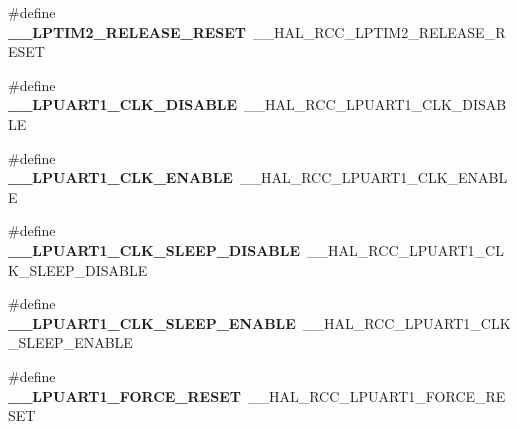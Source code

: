 \begin{DoxyCompactItemize}
\item 
\mbox{\label{group___h_a_l___r_c_c___aliased_gadd807afbe3725b62026e46e99531efac}} 
\#define {\bfseries \+\_\+\+\_\+\+L\+P\+T\+I\+M2\+\_\+\+R\+E\+L\+E\+A\+S\+E\+\_\+\+R\+E\+S\+ET}~\+\_\+\+\_\+\+H\+A\+L\+\_\+\+R\+C\+C\+\_\+\+L\+P\+T\+I\+M2\+\_\+\+R\+E\+L\+E\+A\+S\+E\+\_\+\+R\+E\+S\+ET
\item 
\mbox{\label{group___h_a_l___r_c_c___aliased_gaed58b8ae517de9035a76e9c804087fa6}} 
\#define {\bfseries \+\_\+\+\_\+\+L\+P\+U\+A\+R\+T1\+\_\+\+C\+L\+K\+\_\+\+D\+I\+S\+A\+B\+LE}~\+\_\+\+\_\+\+H\+A\+L\+\_\+\+R\+C\+C\+\_\+\+L\+P\+U\+A\+R\+T1\+\_\+\+C\+L\+K\+\_\+\+D\+I\+S\+A\+B\+LE
\item 
\mbox{\label{group___h_a_l___r_c_c___aliased_ga31a3336329cc12613dc4741af218dcca}} 
\#define {\bfseries \+\_\+\+\_\+\+L\+P\+U\+A\+R\+T1\+\_\+\+C\+L\+K\+\_\+\+E\+N\+A\+B\+LE}~\+\_\+\+\_\+\+H\+A\+L\+\_\+\+R\+C\+C\+\_\+\+L\+P\+U\+A\+R\+T1\+\_\+\+C\+L\+K\+\_\+\+E\+N\+A\+B\+LE
\item 
\mbox{\label{group___h_a_l___r_c_c___aliased_ga932fe128bb4feb05c8feec3783e08499}} 
\#define {\bfseries \+\_\+\+\_\+\+L\+P\+U\+A\+R\+T1\+\_\+\+C\+L\+K\+\_\+\+S\+L\+E\+E\+P\+\_\+\+D\+I\+S\+A\+B\+LE}~\+\_\+\+\_\+\+H\+A\+L\+\_\+\+R\+C\+C\+\_\+\+L\+P\+U\+A\+R\+T1\+\_\+\+C\+L\+K\+\_\+\+S\+L\+E\+E\+P\+\_\+\+D\+I\+S\+A\+B\+LE
\item 
\mbox{\label{group___h_a_l___r_c_c___aliased_gac9485ddfd5a22a336990ed612758384e}} 
\#define {\bfseries \+\_\+\+\_\+\+L\+P\+U\+A\+R\+T1\+\_\+\+C\+L\+K\+\_\+\+S\+L\+E\+E\+P\+\_\+\+E\+N\+A\+B\+LE}~\+\_\+\+\_\+\+H\+A\+L\+\_\+\+R\+C\+C\+\_\+\+L\+P\+U\+A\+R\+T1\+\_\+\+C\+L\+K\+\_\+\+S\+L\+E\+E\+P\+\_\+\+E\+N\+A\+B\+LE
\item 
\mbox{\label{group___h_a_l___r_c_c___aliased_gaee163600587d77d2a199481ca6935c1b}} 
\#define {\bfseries \+\_\+\+\_\+\+L\+P\+U\+A\+R\+T1\+\_\+\+F\+O\+R\+C\+E\+\_\+\+R\+E\+S\+ET}~\+\_\+\+\_\+\+H\+A\+L\+\_\+\+R\+C\+C\+\_\+\+L\+P\+U\+A\+R\+T1\+\_\+\+F\+O\+R\+C\+E\+\_\+\+R\+E\+S\+ET
\item 
\mbox{\label{group___h_a_l___r_c_c___aliased_gaa785c5b0b6b59ec86a4a33307071d8b1}} 

\end{DoxyCompactItemize}
